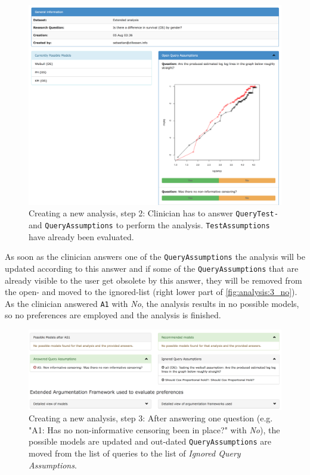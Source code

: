 \begin{figure}[t]
	\centering
	\includegraphics[width=\textwidth]{figures/ui_analysis_1}
	\caption{Creating a new analysis, step 2: Clinician has to answer \texttt{QueryTest-} and \texttt{QueryAssumptions} to perform the analysis. \texttt{TestAssumptions} have already been evaluated.}
	\label{fig:analysis:2}
\end{figure}


As soon as the clinician answers one of the \texttt{QueryAssumptions} the analysis will be updated according to this answer and if some of the \texttt{QueryAssumptions} that are already visible to the user get obsolete by this answer, they will be removed from the open- and moved to the ignored-list (right lower part of \autoref{fig:analysis:3_no}). 
As the clinician answered \texttt{A1} with \textit{No}, the analysis results in no possible models, so no preferences are employed and the analysis is finished.

\begin{figure}[t]
	\centering
	\includegraphics[width=\textwidth]{figures/ui_analysis_2_no}
	\caption{Creating a new analysis, step 3: After answering one question (e.g. "A1: Has no non-informative censoring been in place?" with \textit{No}), the possible models are updated and out-dated \texttt{QueryAssumptions} are moved from the list of queries to the list of \textit{Ignored Query Assumptions}.}
	\label{fig:analysis:3_no}
\end{figure}

